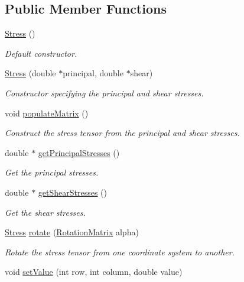 \subsection*{Public Member Functions}
\begin{DoxyCompactItemize}
\item 
\hyperlink{classStress_aa01e83a3f6791cbadc5a368e3a40515e}{Stress} ()
\begin{DoxyCompactList}\small\item\em Default constructor. \end{DoxyCompactList}\item 
\hyperlink{classStress_ae4e2f6250e3bdd4d3d78a9c6bdde7bab}{Stress} (double $\ast$principal, double $\ast$shear)
\begin{DoxyCompactList}\small\item\em Constructor specifying the principal and shear stresses. \end{DoxyCompactList}\item 
void \hyperlink{classStress_aa395d5763df8feb4689e0c5524c9e562}{populate\-Matrix} ()
\begin{DoxyCompactList}\small\item\em Construct the stress tensor from the principal and shear stresses. \end{DoxyCompactList}\item 
double $\ast$ \hyperlink{classStress_aca57d2719f43701dd2ebf2ab00afa539}{get\-Principal\-Stresses} ()
\begin{DoxyCompactList}\small\item\em Get the principal stresses. \end{DoxyCompactList}\item 
double $\ast$ \hyperlink{classStress_afe8214b8e9061930e6598e1970fd61f5}{get\-Shear\-Stresses} ()
\begin{DoxyCompactList}\small\item\em Get the shear stresses. \end{DoxyCompactList}\item 
\hyperlink{classStress}{Stress} \hyperlink{classStress_a8bbcd34d10748bf6febd32213ac5bf8e}{rotate} (\hyperlink{classRotationMatrix}{Rotation\-Matrix} alpha)
\begin{DoxyCompactList}\small\item\em Rotate the stress tensor from one coordinate system to another. \end{DoxyCompactList}\item 
void \hyperlink{classMatrix33_a6cdcec77fd089b2e73ad7ae85ecff30b}{set\-Value} (int row, int column, double value)

\end{DoxyCompactItemize}
